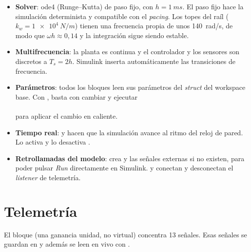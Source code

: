 \begin{itemize}
  \item \textbf{Solver}: ode4 (Runge--Kutta) de paso fijo, con $h=\SI{1}{ms}$. El paso fijo hace la simulación determinista y compatible con el \emph{pacing}. Los topes del raíl ($k_w=\SI{1e4}{N/m}$) tienen una frecuencia propia de unos \SI{140}{rad/s}, de modo que $\omega h\approx0{,}14$ y la integración sigue siendo estable.
  \item \textbf{Multifrecuencia}: la planta es continua y el controlador y los sensores son discretos a $T_s=2h$. Simulink inserta automáticamente las transiciones de frecuencia.
  \item \textbf{Parámetros}: todos los bloques leen sus parámetros del \emph{struct}  del workspace base. Con , basta con cambiar  y ejecutar\\ \\ para aplicar el cambio en caliente.
  \item \textbf{Tiempo real}:  y  hacen que la simulación avance al ritmo del reloj de pared. Lo activa  y lo desactiva .
  \item \textbf{Retrollamadas del modelo}:  crea  y las señales externas si no existen, para poder pulsar \emph{Run} directamente en Simulink.  y  conectan y desconectan el \emph{listener} de telemetría.
\end{itemize}

\section{Telemetría}

El bloque  (una ganancia unidad, no virtual) concentra 13 señales. Esas señales se guardan en  y además se leen en vivo con .

